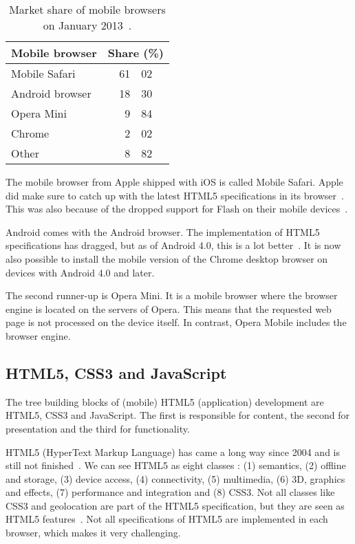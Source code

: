 \documentclass[a4paper]{artikel3}
\begin{document}
\begin{table}
\centering
\begin{tabular}[b]{l r@{.}l}
\toprule
\textbf{Mobile browser} & \multicolumn{2}{c}{\textbf{Share (\%)}} \\
\midrule
Mobile Safari		& 61 	& 02	 	\\
Android browser		& 18 	& 30 	\\
Opera Mini			& 9 		& 84 	\\
Chrome				& 2		& 02 	\\
Other				& 8		& 82		\\
\bottomrule
\end{tabular}
\caption{Market share of mobile  browsers on January 2013~\protect\cite{NetApplications2012}.}
\label{table:mobile-browsers}
\end{table}

The mobile browser from Apple shipped with iOS is called Mobile Safari.
Apple did make sure to catch up with the latest HTML5 specifications in its browser~\cite{Hales2012}.
This was also because of the dropped support for Flash on their mobile devices~\cite{Jobs2010}.

Android comes with the Android browser.
The implementation of HTML5 specifications has dragged, but as of Android 4.0, this is a lot better~\cite{Hales2012}.
It is now also possible to install the mobile version of the Chrome desktop browser on devices with Android 4.0 and later.

The second runner-up is Opera Mini.
It is a mobile browser where the browser engine is located on the servers of Opera.
This means that the requested web page is not processed on the device itself.
In contrast, Opera Mobile includes the browser engine.

\subsection{HTML5, CSS3 and JavaScript}
The tree building blocks of (mobile) HTML5 (application) development are HTML5, CSS3 and JavaScript.
The first is responsible for content, the second for presentation and the third for functionality. 

HTML5 (HyperText Markup Language) has came a long way since 2004 and is still not finished~\cite{MacDonald2011}.
We can see HTML5 as eight classes \cite{W3C2012}: (1) semantics, (2) offline and storage, (3) device access, (4) connectivity, (5) multimedia, (6) 3D, graphics and effects, (7) performance and integration and (8) CSS3.
Not all classes like CSS3 and geolocation are part of the HTML5 specification, but they are seen as HTML5 features~\cite{MacDonald2011}.
Not all specifications of HTML5 are implemented in each browser, which makes it very challenging.
\end{document}
